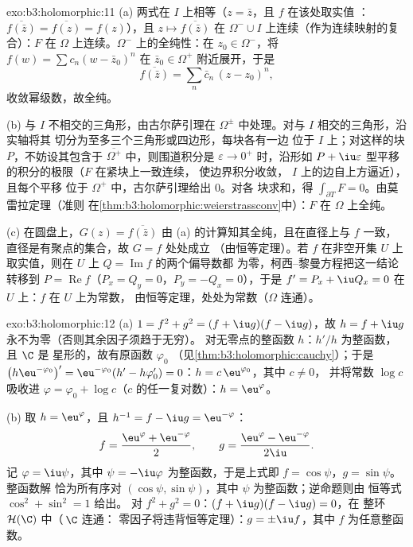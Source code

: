 \begin{solution}{exo:b3:holomorphic:11}
(a) 两式在 $I$ 上相等（$z = \bar z$，且 $f$ 在该处取实值
：$\overline{f(\bar z)} = \overline{f(z)} = f(z)$），且
$z \mapsto \overline{f(\bar z)}$ 在
$\Omega^-\cup I$ 上连续（作为连续映射的复合）：$F$ 在
$\Omega$ 上连续。$\Omega^-$ 上的全纯性：在 $z_0
\in \Omega^-$，将 $f(w) = \sum c_n(w - \bar z_0)^n$ 在
$\bar z_0 \in \Omega^+$ 附近展开，于是
\[
\overline{f(\bar z)} = \sum_n\bar c_n\,(z - z_0)^n,
\]
收敛幂级数，故全纯。

(b) 与 $I$ 不相交的三角形，由古尔萨引理在
$\Omega^\pm$ 中处理。对与 $I$ 相交的三角形，沿实轴将其
切分为至多三个三角形或四边形，每块各有一边
位于 $I$ 上；对这样的块 $P$，不妨设其包含于
$\overline{\Omega^+}$ 中，则围道积分是
$\varepsilon \to 0^+$ 时，沿形如 $P + \iu
\varepsilon$ 型平移的积分的极限（$F$ 在紧块上一致连续，
使边界积分收敛，
$I$ 上的边自上方逼近），且每个平移
位于 $\Omega^+$ 中，古尔萨引理给出 $0$。对各
块求和，得 $\int_{\partial T}F = 0$。由莫雷拉定理（准则
在\cref{thm:b3:holomorphic:weierstrassconv}中）：$F$ 在
$\Omega$ 上全纯。

(c) 在圆盘上，$G(z) = \overline{f(\bar z)}$
由 (a) 的计算知其全纯，且在直径上与 $f$
一致，直径是有聚点的集合，故 $G = f$ 处处成立
（由恒等定理）。若 $f$ 在非空开集
$U$ 上取实值，则在 $U$ 上 $Q = \operatorname{Im}f$ 的两个偏导数都
为零，柯西–黎曼方程把这一结论转移到 $P =
\operatorname{Re}f$（$P_x = Q_y = 0$，$P_y = -Q_x = 0$），于是
$f' = P_x + \iu Q_x = 0$ 在 $U$ 上：$f$ 在 $U$ 上为常数，
由恒等定理，处处为常数（$\Omega$
连通）。
\end{solution}

\begin{solution}{exo:b3:holomorphic:12}
(a) $1 = f^2 + g^2 = (f + \iu g)(f - \iu g)$，故 $h = f +
\iu g$ 永不为零（否则其余因子须趋于无穷）。
对无零点的整函数 $h$：$h'/h$ 为整函数，且 $\C$ 是
星形的，故有原函数 $\varphi_0$
（见\cref{thm:b3:holomorphic:cauchy}）；于是
$\bigl(h\eu^{-\varphi_0}\bigr)' = \eu^{-\varphi_0}(h' -
h\varphi_0') = 0$：$h = c\,\eu^{\varphi_0}$，其中 $c \neq 0$，
并将常数 $\log c$ 吸收进 $\varphi = \varphi_0
+ \log c$（$c$ 的任一复对数）：$h =
\eu^{\varphi}$。

(b) 取 $h = \eu^{\varphi}$，且 $h^{-1} = f - \iu g =
\eu^{-\varphi}$：
\[
f = \frac{\eu^{\varphi} + \eu^{-\varphi}}2,
\qquad
g = \frac{\eu^{\varphi} - \eu^{-\varphi}}{2\iu} .
\]
记 $\varphi = \iu\psi$，其中 $\psi = -\iu\varphi$
为整函数，于是上式即 $f = \cos\psi$，$g = \sin\psi$。整函数解
恰为所有序对 $(\cos\psi,
\sin\psi)$，其中 $\psi$ 为整函数；逆命题则由
恒等式 $\cos^2 + \sin^2 = 1$ 给出。
对 $f^2 + g^2 = 0$：$(f + \iu g)(f - \iu g) = 0$，在
整环 $\mathcal H(\C)$ 中（\,$\C$ 连通：
零因子将违背恒等定理）：$g = \pm\iu
f$，其中 $f$ 为任意整函数。
\end{solution}

